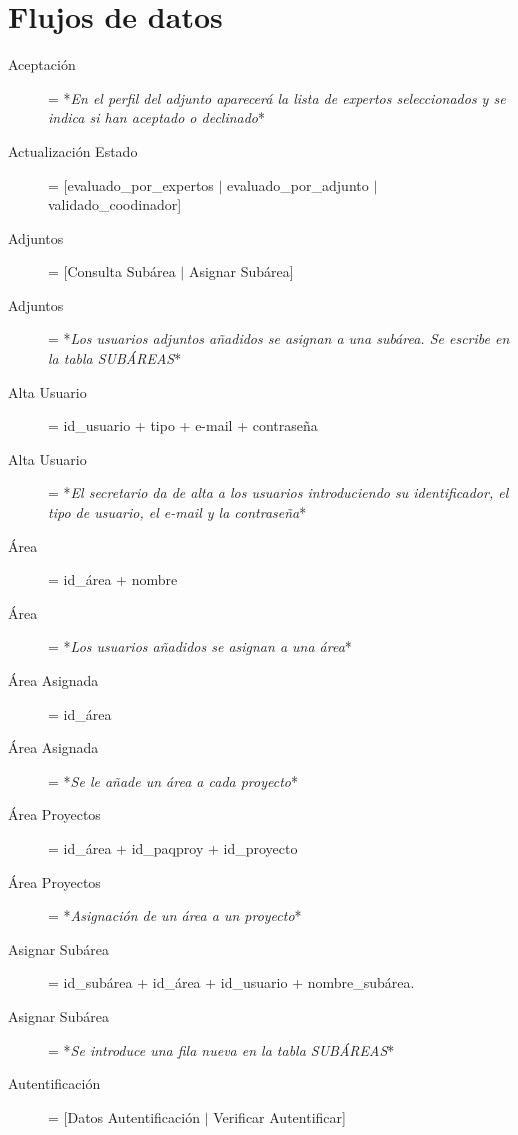 \documentclass[12pt,a4paper,spanish,twoside]{book}
\begin{document}
\section{Flujos de datos}
\begin{description}
\item[Aceptación] = *\emph{En el perfil del adjunto aparecerá la lista de
    expertos seleccionados y se indica si han aceptado o declinado}* 

\item[Actualización Estado] = [evaluado\_por\_expertos $\mid$
  evaluado\_por\_adjunto $\mid$ validado\_coodinador] 

\item[Adjuntos] = [Consulta Subárea $\mid$ Asignar Subárea]

\item[Adjuntos] = *\emph{Los usuarios adjuntos añadidos se asignan a una
    subárea. Se escribe en la tabla SUBÁREAS}* 
 
\item[Alta Usuario] = id\_usuario + tipo + e-mail + contraseña

\item[Alta Usuario] = *\emph{El secretario da de alta a los usuarios
    introduciendo su identificador, el tipo de usuario, el e-mail y la
    contraseña}* 

\item[Área] = id\_área + nombre

\item[Área] = *\emph{Los usuarios añadidos se asignan a una área}*

\item[Área Asignada] = id\_área

\item[Área Asignada] = *\emph{Se le añade un área a cada proyecto}*

\item[Área Proyectos] = id\_área + id\_paqproy + id\_proyecto

\item[Área Proyectos] = *\emph{Asignación de un área a un proyecto}*

\item[Asignar Subárea] = id\_subárea + id\_área + id\_usuario + nombre\_subárea.

\item[Asignar Subárea] = *\emph{Se introduce una fila nueva en la tabla
    SUBÁREAS}* 

\item[Autentificación] = [Datos Autentificación $\mid$ Verificar Autentificar]


\end{description}
\end{document}
